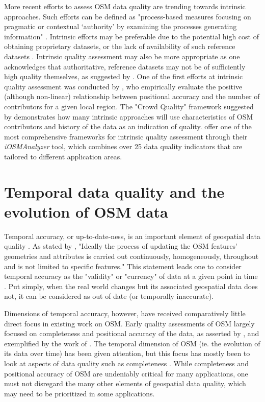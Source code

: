 More recent efforts to assess OSM data quality are trending towards intrinsic approaches. Such efforts can be defined as "process-based measures focusing on pragmatic or contextual ‘authority’ by examining the processes generating information" \parencite[p. 297]{anderson_crowd_2018}. Intrinsic efforts may be preferable due to the potential high cost of obtaining proprietary datasets, or the lack of availability of such reference datasets \parencite{estes_maps_1994}. Intrinsic quality assessment may also be more appropriate as one acknowledges that authoritative, reference datasets may not be of sufficiently high quality themselves, as suggested by \textcite[p. 112]{goodchild_assuring_2012}. One of the first efforts at intrinsic quality assessment was conducted by \textcite{haklay_how_2010-1}, who empirically evaluate the positive (although non-linear) relationship between positional accuracy and the number of contributors for a given local region. The "Crowd Quality" framework suggested by \textcite{van_exel_impact_2010} demonstrates how many intrinsic approaches will use characteristics of OSM contributors and history of the data as an indication of quality. \textcite{barron_comprehensive_2014} offer one of the most comprehensive frameworks for intrinsic quality assessment through their \textit{iOSMAnalyzer} tool, which combines over 25 data quality indicators that are tailored to different application areas. 

\section{Temporal data quality and the evolution of OSM data}

Temporal accuracy, or up-to-date-ness, is an important element of geospatial data quality \parencite{van_oort_spatial_2006}. As stated by \textcite[p. 884]{barron_comprehensive_2014}, "Ideally the process of updating the OSM features’ geometries and attributes is carried out continuously, homogeneously, throughout and is not limited to speciﬁc features." This statement leads one to consider temporal accuracy as the "validity" or "currency" of data at a given point in time \parencite[p. 17]{van_oort_spatial_2006}. Put simply, when the real world changes but its associated geospatial data does not, it can be considered as out of date (or temporally inaccurate).	

Dimensions of temporal accuracy, however, have received comparatively little direct focus in existing work on OSM. Early quality assessments of OSM largely focused on completeness and positional accuracy of the data, as asserted by \textcite[p.83]{neis_recent_2014}, and exemplified by the work of \textcite{haklay_how_2010-1, haklay_how_2010, helbich_comparative_2012}. The temporal dimension of OSM (ie. the evolution of its data over time) has been given attention, but this focus has mostly been to look at aspects of data quality such as completeness \parencite{grochenig_estimating_2014}. While completeness and positional accuracy of OSM are undeniably critical for many applications, one must not disregard the many other elements of geospatial data quality, which may need to be prioritized in some applications. 

